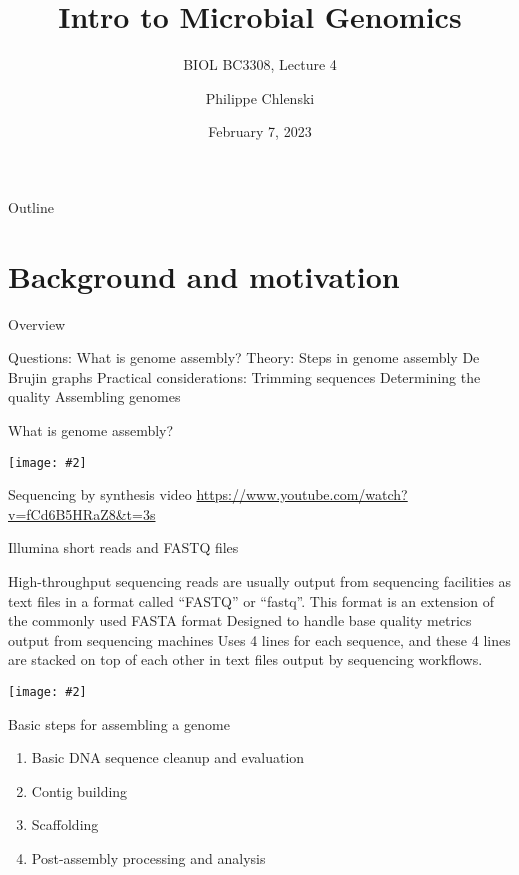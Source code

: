 \documentclass{beamer}
\title{Intro to Microbial Genomics}
\subtitle{BIOL BC3308, Lecture 4}
\author{Philippe Chlenski}
\date{February 7, 2023}
\renewcommand{\c}[1]{\begin{center}#1\end{center}}
\newcommand{\gr}[2][.95]{\c{\texttt{[image: \#2]}}}
\begin{document}
\begin{frame}[plain]
\titlepage
\end{frame}

\begin{frame}{Outline}
\tableofcontents
\end{frame}

\section{Background and motivation}

\begin{frame}{Overview}
\begin{outline}
\1[] Questions:
    \2 What is genome assembly?
\1[] Theory:
    \2 Steps in genome assembly
    \2 De Brujin graphs
\1[] Practical considerations:
    \2 Trimming sequences
    \2 Determining the quality
    \2 Assembling genomes
\end{outline}
\end{frame}

\begin{frame}{What is genome assembly?}
\gr{l4_figs/s3_intro.png}
\end{frame}

\begin{frame}{Sequencing by synthesis video}
\url{https://www.youtube.com/watch?v=fCd6B5HRaZ8&t=3s}
\end{frame}

\begin{frame}{Illumina short reads and FASTQ files}
\begin{outline}
    \1[] High-throughput sequencing reads are usually output from sequencing facilities as text files in a format called “FASTQ” or “fastq”. 
    \1[] This format is an extension of the commonly used FASTA format
    \1[] Designed to handle base quality metrics output from sequencing machines
    \1[] Uses 4 lines for each sequence, and these 4 lines are stacked on top of each other in text files output by sequencing workflows.
\end{outline}
\gr{l4_figs/s5_read.png}
\end{frame}

\begin{frame}{Basic steps for assembling a genome}
\begin{enumerate}
    \item Basic DNA sequence cleanup and evaluation
    \item Contig building
    \item Scaffolding
    \item Post-assembly processing and analysis
\end{enumerate}
\end{frame}
\end{document}
